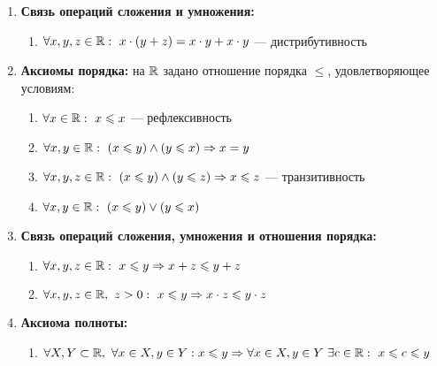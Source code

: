 {\begin{enumerate}[label = \Roman*.]
\begin{enumerate}[label = \alph*.]
        \item $\forall x, y \in \bbR: \ x \cdot y = y \cdot x$ --- коммутативность умножения 
        \item $\forall x, y, z \in \bbR: \ (x \cdot y) \cdot z = x \cdot (y \cdot z)$ --- ассоциативность умножения
        \item $\exists 1 \in \bbR \ \forall x \in \bbR: \ 1 \cdot x = x \cdot 1 = x$ --- существование нейтрального элемента относительно умножения 
        \item $\forall x \in \bbR \ \exists (x^{-1}) \in \bbR: \ x + x^{-1} = 0$ --- существование противоположного элемента
      \end{enumerate}
    \item \textbf{Связь операций сложения и умножения:}
      \begin{enumerate}[label = \alph*.]
        \item $\forall x, y, z \in \mathbb{R}: \ x \cdot (y + z) = x \cdot y + x \cdot y$ --- дистрибутивность
      \end{enumerate}
    \item \textbf{Аксиомы порядка:} на $\mathbb{R}$ задано отношение порядка $\leq$, удовлетворяющее условиям:
      \begin{enumerate}[label = \alph*.]
        \item $\forall x \in \mathbb{R}: \ x \leqslant x$ --- рефлексивность
        \item $\forall x, y \in \mathbb{R}: \ (x \leqslant y) \wedge (y \leqslant x) \Rightarrow x=y$
        \item $\forall x, y, z \in \mathbb{R}: \ (x \leqslant y) \wedge (y \leqslant z) \Rightarrow x \leqslant z$ --- транзитивность
        \item $\forall x, y\in \mathbb{R}: \ (x \leqslant y) \vee (y \leqslant x)$ 
      \end{enumerate}
    \item \textbf{Связь операций сложения, умножения и отношения порядка:}
      \begin{enumerate}[label = \alph*.]
        \item $\forall x, y, z \in \mathbb{R}: \ x \leqslant y \Rightarrow x + z \leqslant y + z$
        \item $\forall x, y, z \in \mathbb{R}, \ z > 0: \ x \leqslant y \Rightarrow x \cdot z \leqslant y \cdot z$
      \end{enumerate}
    \item \textbf{Аксиома полноты:}
      \begin{enumerate}[label = \alph*.]
        \item $\forall X, Y \subset \mathbb{R}, \ \forall x \in X, y \in Y: x \leqslant y \Rightarrow \forall x \in X, y \in Y \ \exists c \in \mathbb{R}: \ x \leqslant c \leqslant y$

      \end{enumerate}

  \end{enumerate}
}

